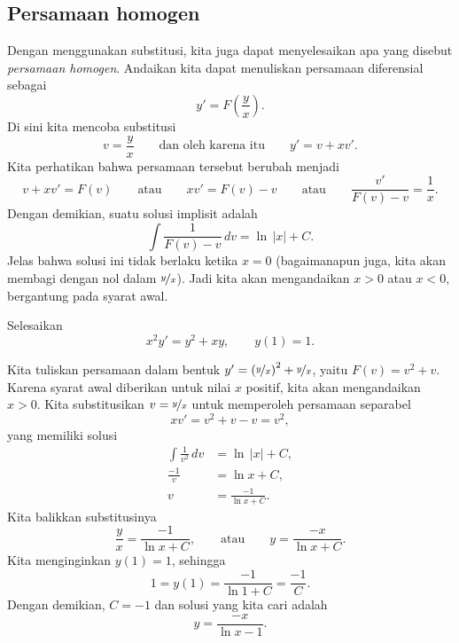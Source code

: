 \subsection{Persamaan homogen}

Dengan menggunakan substitusi, kita juga dapat menyelesaikan apa yang disebut
\emph{persamaan homogen}.
Andaikan kita dapat menuliskan persamaan diferensial sebagai
\begin{equation*}
y' = F\left(\frac{y}{x}\right) .
\end{equation*}
Di sini kita mencoba substitusi
\begin{equation*}
v = \frac{y}{x} \qquad \text{dan oleh karena itu} \qquad y' = v + x v' .
\end{equation*}
Kita perhatikan bahwa persamaan tersebut berubah menjadi
\begin{equation*}
v+ xv' = F(v) \qquad \text{atau} \qquad xv' = F(v)-v
\qquad \text{atau} \qquad \frac{v'}{F(v)-v} = \frac{1}{x} .
\end{equation*}
Dengan demikian, suatu solusi implisit adalah
\begin{equation*}
\int \frac{1}{F(v)-v} \,dv = \ln \, \lvert x \rvert + C .
\end{equation*}
Jelas bahwa solusi ini tidak berlaku ketika $x = 0$ (bagaimanapun juga, kita akan
membagi dengan nol dalam $\nicefrac{y}{x}$). Jadi kita akan mengandaikan $x > 0$
atau $x < 0$, bergantung pada syarat awal.

\begin{example}
Selesaikan
\begin{equation*}
x^2y' = y^2+xy, \qquad y(1)=1.
\end{equation*}

Kita tuliskan persamaan dalam
bentuk $y'= {\left(\nicefrac{y}{x}\right)}^2+\nicefrac{y}{x}$,
yaitu $F(v) = v^2+v$.
Karena syarat awal diberikan untuk nilai $x$ positif,
kita akan mengandaikan $x > 0$.
Kita substitusikan $v=\nicefrac{y}{x}$ untuk memperoleh
persamaan separabel
\begin{equation*}
xv' = v^2+v-v = v^2 ,
\end{equation*}
yang memiliki solusi
\begin{equation*}
\begin{aligned}
\int \frac{1}{v^2} \,dv &= \ln \, \lvert x \rvert + C , \\
\frac{-1}{v} &= \ln x + C , \\
v &= \frac{-1}{\ln x  + C} .
\end{aligned}
\end{equation*}
Kita balikkan substitusinya
\begin{equation*}
\frac{y}{x} = \frac{-1}{\ln x  + C} ,
\qquad
\text{atau}
\qquad
y = \frac{-x}{\ln x  + C} .
\end{equation*}
Kita menginginkan $y(1)=1$, sehingga
\begin{equation*}
1 = y(1) = \frac{-1}{\ln 1 + C} = \frac{-1}{C} .
\end{equation*}
Dengan demikian, $C = -1$ dan
solusi yang kita cari adalah
\begin{equation*}
y = \frac{-x}{\ln x -1} .
\end{equation*}
\end{example}

